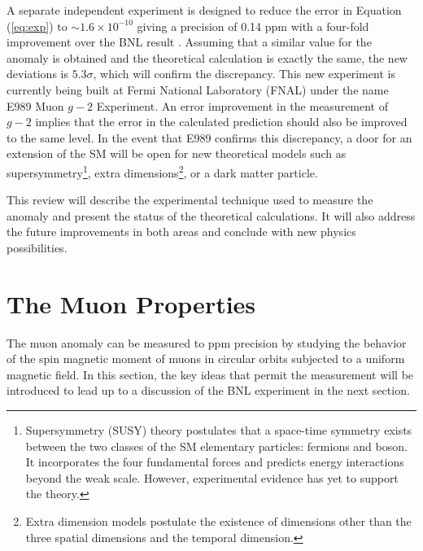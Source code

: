 \documentclass{outhesis}
\begin{document}
A separate independent experiment is designed to reduce the error in Equation (\ref{eq:exp}) to $\sim 1.6 \times 10^{-10}$ giving a precision of 0.14 ppm with a four-fold improvement over the BNL result \cite{bnl}.
Assuming that a similar value for the anomaly is obtained and the theoretical calculation is exactly the same, the new deviations is $5.3\sigma$, which will confirm the discrepancy. This new experiment is currently being built at Fermi National Laboratory (FNAL) under the name E989 Muon $g-2$ Experiment. An error improvement in the measurement of $g-2$ implies that the error in the calculated prediction should also be improved to the same level.
In the event that E989 confirms this discrepancy, a door for an extension of the SM will be open for new theoretical models such as supersymmetry\footnote{Supersymmetry (SUSY) theory postulates that a space-time symmetry exists between the two classes of the SM elementary particles: fermions and boson. It incorporates the four fundamental forces and predicts energy interactions beyond the weak scale. However, experimental evidence has yet to support the theory.}, extra dimensions\footnote{Extra dimension models postulate the existence of dimensions other than the three spatial dimensions and the temporal dimension.}, or a dark matter particle. 

This review will describe the experimental technique used to measure the anomaly and present the status of the theoretical calculations. It will also address the future improvements in both areas and conclude with new physics possibilities.


\section{The Muon Properties}

The muon anomaly can be measured to ppm precision by studying the behavior of the spin magnetic moment of muons in circular orbits subjected to a uniform magnetic field. In this section, the key ideas that permit the measurement will be introduced to lead up to a discussion of the BNL experiment in the next section. 
\end{document}
